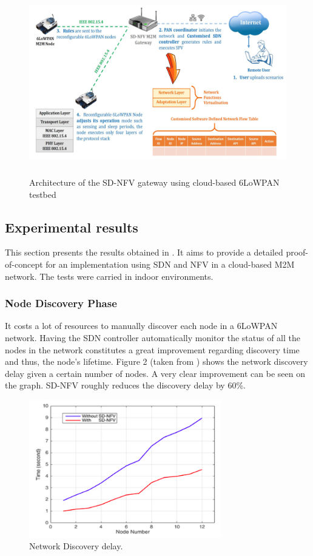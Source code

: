 \documentclass[10pt,journal,compsoc]{IEEEtran}
\begin{document}
\begin{figure}
    \center
    \includegraphics[height=80mm]{architecture}
    \caption{Architecture of the SD-NFV gateway using cloud-based 
    6LoWPAN testbed}
\end{figure}

\subsection{Experimental results}

This section presents the results obtained in \cite{main}.
It aims to provide a detailed proof-of-concept for an 
implementation using SDN and NFV in a cloud-based M2M network. The 
tests were carried in indoor environments. 

\subsubsection{Node Discovery Phase}

It costs a lot of resources to manually discover each node in a 
6LoWPAN network. Having the SDN controller automatically monitor the 
status of all the nodes in the network constitutes a great improvement 
regarding discovery time and thus, the node's lifetime. Figure 2 
(taken from \cite{main}) shows the network discovery delay given a 
certain number of nodes. A very clear improvement can be seen 
on the graph. SD-NFV roughly reduces the discovery delay by 60\%. 

\begin{figure}
  \includegraphics[height=60mm]{nd_delay}
  \caption{Network Discovery delay.}
\end{figure}
\end{document}

